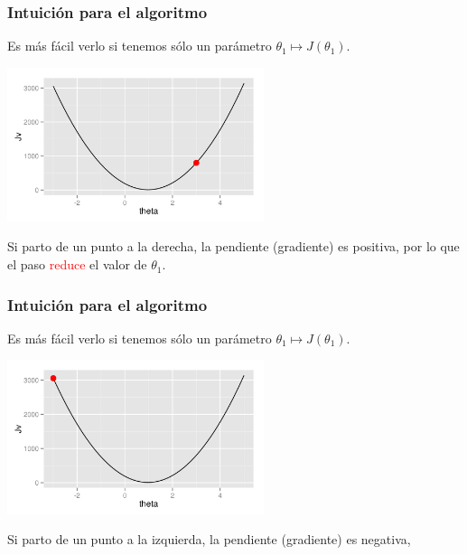 \documentclass[aspectratio=169]{beamer}
\begin{document}
\begin{frame}
 \frametitle{Intuición para el algoritmo}
 \begin{overlayarea}{\textwidth}{8cm}
 Es más fácil verlo si tenemos sólo un parámetro $\theta_1\mapsto J(\theta_1)$.
\begin{center}
  \includegraphics[height=4.5cm]{gradientdescent-derecha-2.png}
\end{center}
Si parto de un punto a la derecha, la pendiente (gradiente) es positiva, por lo que el paso \textcolor{red}{reduce} el valor de $\theta_1$.   
 \end{overlayarea}
\end{frame}
\begin{frame}
 \frametitle{Intuición para el algoritmo}
 \begin{overlayarea}{\textwidth}{8cm}
 Es más fácil verlo si tenemos sólo un parámetro $\theta_1\mapsto J(\theta_1)$.
\begin{center}
  \includegraphics[height=4.5cm]{gradientdescent-izquierda-1.png}
\end{center}
Si parto de un punto a la izquierda, la pendiente (gradiente) es negativa, \vphantom{por lo que el paso aumenta el valor de $\theta_1$.}   
 \end{overlayarea}
\end{frame}
\end{document}
